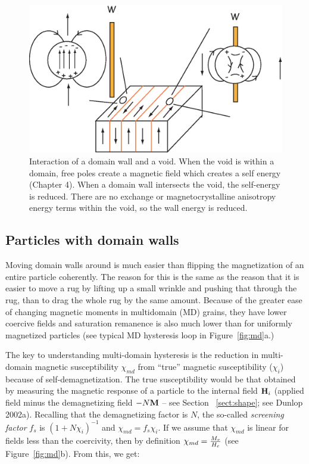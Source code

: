  \begin{figure}[htb]
\centering  \includegraphics[width=12 cm]{EPSfiles/void.eps}
\caption{ Interaction of a domain wall and a void.  When the void is within a domain, free poles create a magnetic field which creates a self energy (Chapter 4).  When a domain wall intersects the void, the self-energy is reduced.  There are no exchange or magnetocrystalline anisotropy energy terms within the void, so the wall energy is reduced.}
\label{fig:void}
\end{figure}




\subsection{Particles with domain walls}
\label{sect:day}


Moving domain walls around is much easier than flipping the magnetization of an entire particle coherently.   The reason for this is the same as the reason that it is easier to move a rug by lifting up a small wrinkle and pushing that through the rug, than to drag the whole rug by the same amount.  Because of the greater ease of changing magnetic moments in multidomain (MD) grains, they have lower coercive fields and saturation remanence is also much lower than for uniformly magnetized particles (see typical MD hysteresis loop in Figure~\ref{fig:md}a.)

The key to understanding multi-domain hysteresis is the reduction in multi-domain magnetic susceptibility  $\chi_{md}$ from ``true'' magnetic susceptibility ($\chi_i$) because of self-demagnetization.  The true susceptibility would be that obtained by measuring the magnetic response of a particle to the internal field $\hbox{\bf H}_i$ (applied field minus the demagnetizing field $-N\hbox{\bf M}$ -- see Section~ \ref{sect:shape}; see 
Dunlop 2002a).  \nocite{dunlop02a}
  Recalling that the demagnetizing factor is $N$, the so-called {\it screening factor} $f_s$ is $(1 + N\chi_i)^{-1}$ and $\chi_{md} = f_s \chi_i $.
If we assume that $\chi_{md}$ is linear for fields less than the coercivity, then by definition $\chi_{md} = {{ M_r}\over{H_c} }$ (see Figure~\ref{fig:md}b).  From this, we get:

